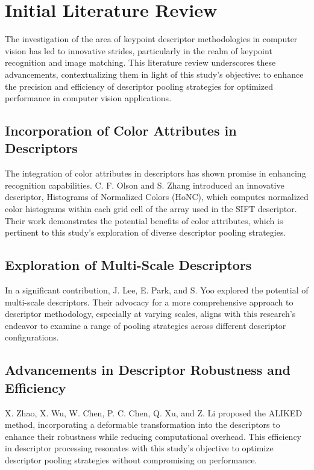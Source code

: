 \section{Initial Literature Review}

The investigation of the area of keypoint descriptor methodologies in computer vision has led to innovative strides, particularly in the realm of keypoint recognition and image matching. This literature review underscores these advancements, contextualizing them in light of this study's objective: to enhance the precision and efficiency of descriptor pooling strategies for optimized performance in computer vision applications.

\subsection{Incorporation of Color Attributes in Descriptors}

The integration of color attributes in descriptors has shown promise in enhancing recognition capabilities. C. F. Olson and S. Zhang \cite{olson2016keypoint} introduced an innovative descriptor, Histograms of Normalized Colors (HoNC), which computes normalized color histograms within each grid cell of the array used in the SIFT descriptor. Their work demonstrates the potential benefits of color attributes, which is pertinent to this study's exploration of diverse descriptor pooling strategies.

\subsection{Exploration of Multi-Scale Descriptors}

In a significant contribution, J. Lee, E. Park, and S. Yoo \cite{lee2023multi} explored the potential of multi-scale descriptors. Their advocacy for a more comprehensive approach to descriptor methodology, especially at varying scales, aligns with this research's endeavor to examine a range of pooling strategies across different descriptor configurations.

\subsection{Advancements in Descriptor Robustness and Efficiency}

X. Zhao, X. Wu, W. Chen, P. C. Chen, Q. Xu, and Z. Li \cite{zhao2023aliked} proposed the ALIKED method, incorporating a deformable transformation into the descriptors to enhance their robustness while reducing computational overhead. This efficiency in descriptor processing resonates with this study's objective to optimize descriptor pooling strategies without compromising on performance.

